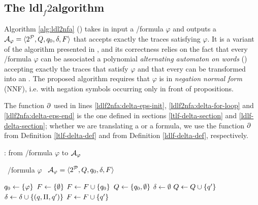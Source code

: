 \subsection{The {\sc ldl}$_f2$\NFA algorithm}
 Algorithm \ref{alg:ldl2nfa} (\LDLfToNFA) takes in input a \LDLf/\LTLf formula $\varphi$ and outputs a \NFA $\mathcal{A}_\varphi = \langle 2^{\mathcal{P}}, Q, q_0, \delta, F \rangle$ that accepts exactly the traces satisfying $\varphi$. It is a variant of the algorithm presented in \citep{DeGiacomo:2015:SLL:2832415.2832466}, and its correctness relies on the fact that every \LDLf/\LTLf formula $\varphi$ can be associated a polynomial \emph{alternating automaton on words} (\AFW) accepting exactly the traces that satisfy $\varphi$ and that every \AFW can be transformed into an \NFA \citep{de2013linear}.
The proposed algorithm requires that $\varphi$ is in \emph{negation normal form} (NNF), i.e. with negation symbols occurring only in front of propositions. 

The function $\partial$ used in lines \ref{ldlf2nfa:delta-eps-init}, \ref{ldlf2nfa:delta-for-loop} and \ref{ldlf2nfa:delta-eps-end} is the one defined in sections \ref{ltlf-delta-section} and \ref{ldlf-delta-section}; whether we are translating a \LTLf or a \LDLf formula, we use the function $\partial$ from Definition \ref{ltlf-delta-def} and from Definition \ref{ldlf-delta-def}, respectively.
\begin{algorithm}
	\caption{\LDLfToNFA: from \LTLf/\LDLf formula $\varphi$ to \NFA $\mathcal{A}_\varphi$}
	\label{alg:ldl2nfa}
	\begin{algorithmic}[1]
		\State \algInput\ \LDLf/\LTLf formula $\varphi$
		\State \algOutput\ \NFA $\mathcal{A}_\varphi = \langle 2^{\mathcal{P}}, Q, q_0, \delta, F \rangle$
		
		\State $q_0 \gets \{\varphi\}$
		\State $F \gets \{\emptyset\}$
		\If{$(\DfunEps{\varphi} = \true)$} \label{ldlf2nfa:delta-eps-init}
			\State $F \gets F \cup \{q_0\}$
		\EndIf
		\State $Q \gets \{q_0, \emptyset\}$
		\State $\delta \gets \emptyset$
				 \label{ldlf2nfa:delta-for-loop}
					\State $Q \gets Q \cup \{q'\}$
					\State $\delta \gets \delta \cup \{(q, \Pi, q')\}$
					 \label{ldlf2nfa:delta-eps-end}
						\State $F \gets F \cup \{q'\}$
					\EndIf
				\EndIf
				
			\EndFor
		
		\EndWhile
		
	
	\end{algorithmic}
	
\end{algorithm}

